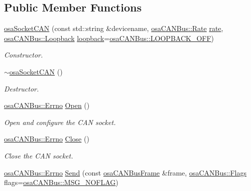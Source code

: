 \subsection*{Public Member Functions}
\begin{DoxyCompactItemize}
\item 
\hyperlink{classosa_socket_c_a_n_a3e7b2c117c7eea2007a36d3848ed0430}{osa\+Socket\+C\+A\+N} (const std\+::string \&devicename, \hyperlink{classosa_c_a_n_bus_ae977dbc0e1c16772395408c8e018fe6c}{osa\+C\+A\+N\+Bus\+::\+Rate} \hyperlink{classosa_c_a_n_bus_a4ff86a9ecf19161b1f34666888e0a331}{rate}, \hyperlink{classosa_c_a_n_bus_a992406c83a336e95fb4a09b0b13df786}{osa\+C\+A\+N\+Bus\+::\+Loopback} \hyperlink{classosa_c_a_n_bus_a724e9c478dd48908882e29f189d98968}{loopback}=\hyperlink{classosa_c_a_n_bus_a992406c83a336e95fb4a09b0b13df786ae2557509d0c1ac68029eeb6bdf6e703d}{osa\+C\+A\+N\+Bus\+::\+L\+O\+O\+P\+B\+A\+C\+K\+\_\+\+O\+F\+F})
\begin{DoxyCompactList}\small\item\em Constructor. \end{DoxyCompactList}\item 
\hyperlink{classosa_socket_c_a_n_ae0c2442fed8f94986b0729382c7e81bf}{$\sim$osa\+Socket\+C\+A\+N} ()
\begin{DoxyCompactList}\small\item\em Destructor. \end{DoxyCompactList}\item 
\hyperlink{classosa_c_a_n_bus_a6fa3e95ec4c36932d0640e40e0748fde}{osa\+C\+A\+N\+Bus\+::\+Errno} \hyperlink{classosa_socket_c_a_n_a5a8bb9db219c9f4072b5bcc357eeb847}{Open} ()
\begin{DoxyCompactList}\small\item\em Open and configure the C\+A\+N socket. \end{DoxyCompactList}\item 
\hyperlink{classosa_c_a_n_bus_a6fa3e95ec4c36932d0640e40e0748fde}{osa\+C\+A\+N\+Bus\+::\+Errno} \hyperlink{classosa_socket_c_a_n_a131308c6fa41ee200b5b1785f12c709b}{Close} ()
\begin{DoxyCompactList}\small\item\em Close the C\+A\+N socket. \end{DoxyCompactList}\item 
\hyperlink{classosa_c_a_n_bus_a6fa3e95ec4c36932d0640e40e0748fde}{osa\+C\+A\+N\+Bus\+::\+Errno} \hyperlink{classosa_socket_c_a_n_a59accc9278f0cbab72e578bb8d486a43}{Send} (const \hyperlink{classosa_c_a_n_bus_frame}{osa\+C\+A\+N\+Bus\+Frame} \&frame, \hyperlink{classosa_c_a_n_bus_a74fe35c6059237887431f3ccece7b21b}{osa\+C\+A\+N\+Bus\+::\+Flags} flags=\hyperlink{classosa_c_a_n_bus_a74fe35c6059237887431f3ccece7b21ba30f701fa6e0dba6e274540941ccd3978}{osa\+C\+A\+N\+Bus\+::\+M\+S\+G\+\_\+\+N\+O\+F\+L\+A\+G})

\end{DoxyCompactItemize}
